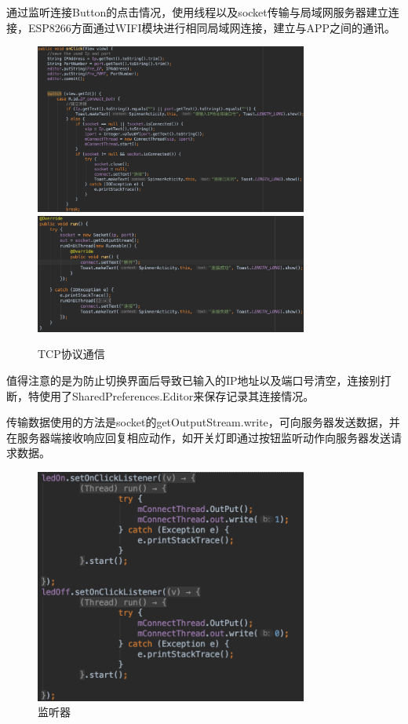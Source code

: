 \begin{enumerate}
通过监听连接Button的点击情况，使用线程以及socket传输与局域网服务器建立连接，ESP8266方面通过WIFI模块进行相同局域网连接，建立与APP之间的通讯。

\begin{figure}[htbp]
    \centering
    \includegraphics[width=0.8\textwidth]{figures/code/8}
    \includegraphics[width=0.8\textwidth]{figures/code/9}
    \caption{TCP协议通信}
\end{figure}

值得注意的是为防止切换界面后导致已输入的IP地址以及端口号清空，连接别打断，特使用了SharedPreferences.Editor来保存记录其连接情况。

传输数据使用的方法是socket的getOutputStream.write，可向服务器发送数据，并在服务器端接收响应回复相应动作，如开关灯即通过按钮监听动作向服务器发送请求数据。

\begin{figure}[htbp]
    \centering
    \includegraphics[width=0.8\textwidth]{figures/code/10}
    \caption{监听器}
\end{figure}


\end{enumerate}
